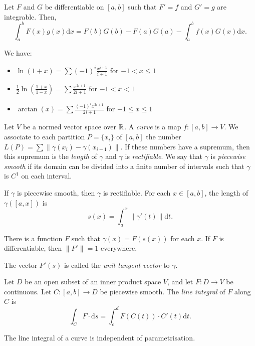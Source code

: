 \begin{thm}
    Let $F$ and $G$ be differentiable on $[a,b]$ such that $F'=f$ and $G'=g$ are
    integrable. Then,
    \[\int_a^b F(x)g(x)\mathrm dx=F(b)G(b)-F(a)G(a)-\int_a^b f(x)G(x)\mathrm
    dx.\]
\end{thm}
\begin{prop}
    We have:
    \begin{itemize}
        \item $\ln(1+x)=\sum (-1)^i\frac{x^{i+1}}{i+1}$ for $-1<x\le 1$
        \item $\frac12\ln\left(\frac{1+x}{1-x}\right)=\sum
            \frac{x^{2i+1}}{2i+1}$ for $-1<x<1$
        \item $\arctan(x)=\sum \frac{(-1)^i x^{2i+1}}{2i+1}$ for $-1\le x\le 1$
    \end{itemize}
\end{prop}
\begin{defn}
    Let $V$ be a normed vector space over $\mathbb{R}$. A \emph{curve} is a map $f:[a,b]\to
    V$. We associate to each partition $P=\{x_i\}$ of $[a,b]$ the number
    $L(P)=\sum\|\gamma(x_i)-\gamma(x_{i-1})\|$. If these numbers have a
    supremum, then this supremum is the \emph{length} of $\gamma$ and $\gamma$
    is \emph{rectifiable}. We say that $\gamma$ is \emph{piecewise smooth} if
    its domain can be divided into a finite number of intervals such that
    $\gamma$ is $C^1$ on each interval.
\end{defn}
\begin{prop}
    If $\gamma$ is piecewise smooth, then $\gamma$ is rectifiable. For each
    $x\in[a,b]$, the length of $\gamma([a,x])$ is
    \[s(x)=\int_a^x\|\gamma'(t)\|\mathrm dt.\]
\end{prop}
\begin{prop}
    There is a function $F$
    such that $\gamma(x)=F(s(x))$ for each $x$. If $F$ is differentiable, then
    $\|F'\|=1$ everywhere.
\end{prop}
\begin{defn}
    The vector $F'(s)$ is called the \emph{unit tangent vector} to $\gamma$.
\end{defn}
\begin{defn}
    Let $D$ be an open subset of an inner product space $V$, and let $F:D\to V$
    be continuous. Let $C:[a,b]\to D$ be piecewise smooth.
    The \emph{line integral} of $F$ along $C$ is
    \[\int_C F\cdot\mathrm ds=\int_c^d F(C(t))\cdot C'(t)\mathrm dt.\]
\end{defn}
\begin{prop}
    The line integral of a curve is independent of parametrisation.
\end{prop}

